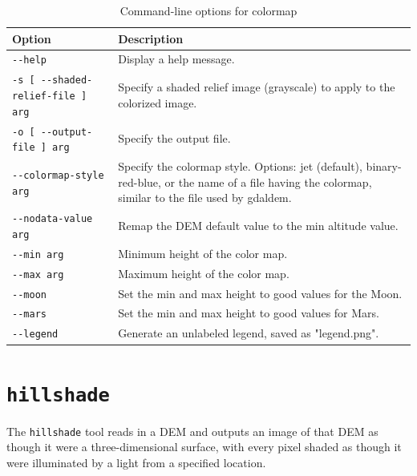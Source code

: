\begin{longtable}{|l|p{10cm}|}
\caption{Command-line options for colormap}
\label{tbl:colormap}
\endfirsthead
\endhead
\endfoot
\endlastfoot
\hline
Option & Description \\ \hline \hline
\verb#--help# & Display a help message. \\ \hline
\verb#-s [ --shaded-relief-file ] arg# & Specify a shaded relief image (grayscale) to apply to the colorized image. \\ \hline
\verb#-o [ --output-file ] arg# & Specify the output file. \\ \hline
\verb#--colormap-style arg# & Specify the colormap style. Options: jet (default), binary-red-blue, or the name of a file having the colormap, similar to the file used by gdaldem. \\ \hline
\verb#--nodata-value arg# & Remap the DEM default value to the min altitude value. \\ \hline
\verb#--min arg# & Minimum height of the color map. \\ \hline
\verb#--max arg# & Maximum height of the color map. \\ \hline
\verb#--moon# & Set the min and max height to good values for the Moon. \\ \hline
\verb#--mars# & Set the min and max height to good values for Mars. \\ \hline
\verb#--legend# & Generate an unlabeled legend, saved as "legend.png". \\ \hline

\end{longtable}

\section{{\tt hillshade}}
\label{sec:hillshade}

The \verb#hillshade# tool reads in a DEM and outputs an image of that
DEM as though it were a three-dimensional surface, with every pixel
shaded as though it were illuminated by a light from a specified
location.


